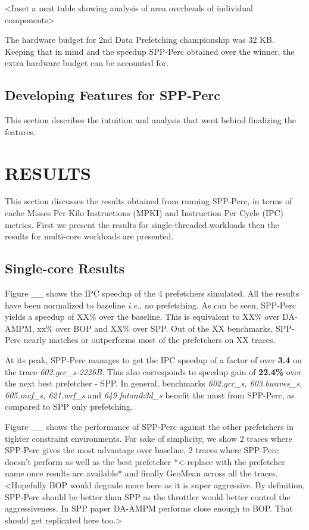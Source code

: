 \documentclass{sig-alternate}
\begin{document}
<Inset a neat table showing analysis of area overheads of individual components>

The hardware budget for 2nd Data Prefetching championship was 32 KB. 
Keeping that in mind and the speedup SPP-Perc obtained over the winner, the extra hardware budget can be accounted for.

\subsection{Developing Features for SPP-Perc}
This section describes the intuition and analysis that went behind finalizing the features. 
 


\section{RESULTS}
This section discusses the results obtained from running SPP-Perc, in terms of cache Misses Per Kilo Instructions (MPKI) and Instruction Per Cycle (IPC) metrics. 
First we present the results for single-threaded workloads then the results for multi-core workloads are presented.

\subsection{Single-core Results}
Figure \_\_ shows the IPC speedup of the 4 prefetchers simulated. 
All the results have been normalized to baseline \textit{i.e.}, no prefetching. 
As can be seen, SPP-Perc yields a speedup of XX\% over the baseline. 
This is equivalent to XX\% over DA-AMPM, xx\% over BOP and XX\% over SPP. 
Out of the XX benchmarks, SPP-Perc nearly matches or outperforms most of the prefetchers on XX traces. 

At its peak, SPP-Perc manages to get the IPC speedup of a factor of over \textbf{3.4} on the trace \textit{602.gcc\_s-2226B}. 
This also corresponds to speedup gain of \textbf{22.4\%} over the next best prefetcher - SPP. 
In general, benchmarks \textit{602.gcc\_s, 603.bwaves\_s, 605.mcf\_s, 621.wrf\_s} and \textit{649.fotonik3d\_s} benefit the most from SPP-Perc, as compared to SPP only prefetching.

Figure \_\_ shows the performance of SPP-Perc against the other prefetchers in tighter constraint environments. 
For sake of simplicity, we show 2 traces where SPP-Perc gives the most advantage over baseline, 2 traces where SPP-Perc doesn't perform as well as the best prefetcher *<-replace with the prefetcher name once results are available* and finally GeoMean across all the traces. 
<Hopefully BOP would degrade more here as it is super aggressive. 
By definition, SPP-Perc should be better than SPP as the throttler would better control the aggressiveness. 
In SPP paper DA-AMPM performs close enough to BOP. That should get replicated here too.>
\end{document}
